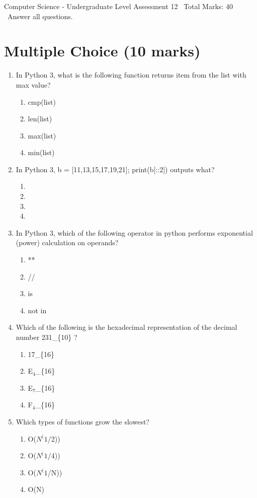 \documentclass[12pt]{article}
\begin{document}
\begin{center}
Computer Science - Undergraduate Level Assessment 12 \
Total Marks: 40 \
Answer all questions.
\end{center}

\section*{Multiple Choice (10 marks)}
\begin{enumerate}[label=\arabic*.]
\item In Python 3, what is the following function returns item from the list with max value?
\begin{enumerate}[label=(\alph*)]
    \item cmp(list)
    \item len(list)
    \item max(list)
    \item min(list)
\end{enumerate}
\item In Python 3, b = [11,13,15,17,19,21]; print(b[::2]) outputs what?
\begin{enumerate}[label=(\alph*)]
    \item [19,21]
    \item [11,15]
    \item [11,15,19]
    \item [13,17,21]
\end{enumerate}
\item In Python 3, which of the following operator in python performs exponential (power) calculation on operands?
\begin{enumerate}[label=(\alph*)]
    \item **
    \item //
    \item is
    \item not in
\end{enumerate}
\item Which of the following is the hexadecimal representation of the decimal number 231\_\{10\} ?
\begin{enumerate}[label=(\alph*)]
    \item 17\_\{16\}
    \item E$_{4}$\_\{16\}
    \item E$_{7}$\_\{16\}
    \item F$_{4}$\_\{16\}
\end{enumerate}
\item Which types of functions grow the slowest?
\begin{enumerate}[label=(\alph*)]
    \item O($N^(1$/2))
    \item O($N^(1$/4))
    \item O($N^(1$/N))
    \item O(N)
\end{enumerate}
\end{enumerate}
\end{document}
